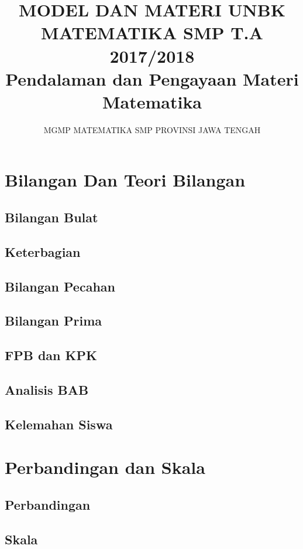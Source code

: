 \documentclass[12pt,a4paper,twoside,openany]{book}
\author{MGMP MATEMATIKA SMP PROVINSI JAWA TENGAH}
\title{MODEL DAN MATERI UNBK MATEMATIKA SMP T.A 2017/2018\\ Pendalaman dan Pengayaan Materi Matematika}
\begin{document}
\maketitle
\tableofcontents
\chapter{Bilangan Dan Teori Bilangan}
\section{Bilangan Bulat}
	
\section{Keterbagian}
			
\section{Bilangan Pecahan}
	
\section{Bilangan Prima}
	
\section{FPB dan KPK}
	
\section{Analisis BAB}
\section{Kelemahan Siswa}

\chapter{Perbandingan dan Skala}
\section{Perbandingan}
	

\section{Skala}
	
\end{document}
